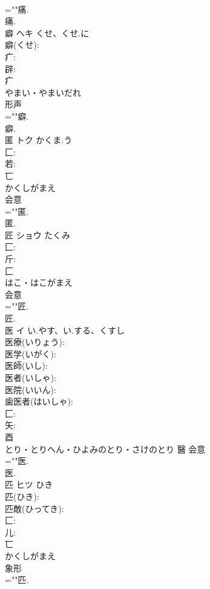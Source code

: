 \documentclass[8pt]{extreport}
\begin{document}
\begin{CJK}{UTF8}{min}
\\	=""痛.
\\	痛.
\\	癖	ヘキ	くせ、くせ.に		
\\	癖(くせ): 
\\	疒: 
\\	辟: 
\\	疒	
\\	やまい・やまいだれ	
\\	形声 
\\	=""癖.
\\	癖.
\\	匿	トク	かくま.う		
\\	匚: 
\\	若: 
\\	匸	
\\	かくしがまえ	
\\	会意 
\\	=""匿.
\\	匿.
\\	匠	ショウ	たくみ		
\\	匚: 
\\	斤: 
\\	匚	
\\	はこ・はこがまえ	
\\	会意 
\\	=""匠.
\\	匠.
\\	医	イ	い.やす、い.する、くすし		
\\	医療(いりょう): 
\\	医学(いがく): 
\\	医師(いし): 
\\	医者(いしゃ): 
\\	医院(いいん): 
\\	歯医者(はいしゃ): 
\\	匚: 
\\	矢: 
\\	酉	
\\	とり・とりへん・ひよみのとり・さけのとり	醫	会意 
\\	=""医.
\\	医.
\\	匹	ヒツ	ひき		
\\	匹(ひき): 
\\	匹敵(ひってき): 
\\	匚: 
\\	儿: 
\\	匸	
\\	かくしがまえ	
\\	象形 
\\	=""匹.

\end{CJK}
\end{document}
